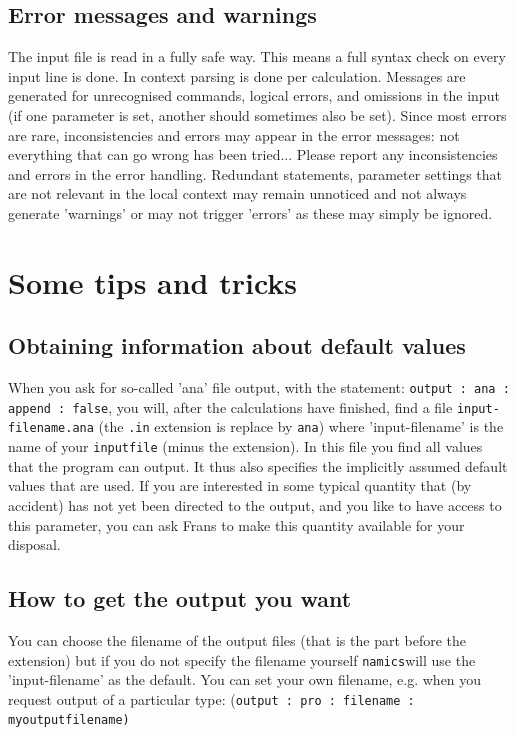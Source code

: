 \documentclass{article}
\newcommand{\namics}{{\tt namics}}
\begin{document}
\subsection{Error messages and warnings}
The input file is read in a fully safe way.  This means a full syntax check on every input line is done. In context parsing is done per calculation. Messages are generated for unrecognised commands, logical errors, and omissions in the input (if one parameter is set, another should sometimes also be set).  Since most errors are rare, inconsistencies and errors may  appear in the error messages: not everything that can go wrong has been tried...  Please report any inconsistencies and errors in the error handling. Redundant statements, parameter settings that are not relevant in the local context may remain unnoticed and not always generate 'warnings' or may not trigger 'errors' as these may simply be ignored. 

\section{Some tips and tricks}

\subsection{Obtaining information about default values}
When you ask for so-called 'ana' file output, with the statement: 
{\tt output : ana : append : false},  you will, after the calculations have finished, find a file {\tt input-filename.ana} (the {\tt .in} extension is replace by {\tt ana}) where 'input-filename' is the name of your {\tt inputfile} (minus the extension). In this file you find all values that the program can output. It thus also specifies the implicitly assumed default values that are used. If you are interested in some typical quantity that (by accident) has not yet been directed to the output, and you like to have access to this parameter, you can ask Frans to make this quantity available for your disposal. 

\subsection{How to get the output you want}
You can choose the filename of the output files (that is the part before the extension) but if you do not specify the filename yourself \namics will use the 'input-filename' as the default. You can set your own filename, e.g. when you request output of a particular type: (\tt output : pro : filename : myoutputfilename) 
\end{document}
